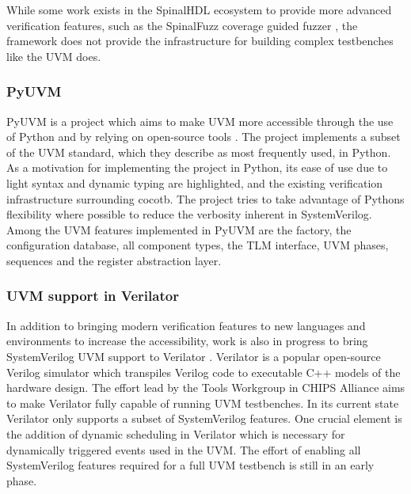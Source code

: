 While some work exists in the SpinalHDL ecosystem to provide more advanced verification features, such as the SpinalFuzz coverage guided fuzzer \cite{ruep2022spinalfuzz}, the framework does not provide the infrastructure for building complex testbenches like the UVM does.


\subsubsection{PyUVM} %

PyUVM is a project which aims to make UVM more accessible through the use of Python and by relying on open-source
tools \cite{pyuvm}. The project implements a subset of the UVM standard, which they describe as most frequently used,
in Python. As a motivation for implementing the project in Python, its ease of use due to light syntax and dynamic
typing are highlighted, and the existing verification infrastructure surrounding cocotb. The project tries to take
advantage of Pythons flexibility where possible to reduce the verbosity inherent in SystemVerilog. Among the UVM
features implemented in PyUVM are the factory, the configuration database, all component types, the TLM interface,
UVM phases, sequences and the register abstraction layer.

\subsubsection{UVM support in Verilator} %

In addition to bringing modern verification features to new languages and environments to increase the accessibility,
work is also in progress to bring SystemVerilog UVM support to Verilator \cite{uvm_verilator}. Verilator is a popular
open-source
Verilog simulator which transpiles Verilog code to executable C++ models of the hardware design. The effort lead by
the Tools Workgroup in CHIPS Alliance aims to make Verilator fully capable of running UVM testbenches. In its current
state Verilator only supports a subset of SystemVerilog features. One crucial element is the addition of dynamic
scheduling in Verilator which is necessary for dynamically triggered events used in the UVM. The effort of enabling
all SystemVerilog features required for a full UVM testbench is still in an early phase.

